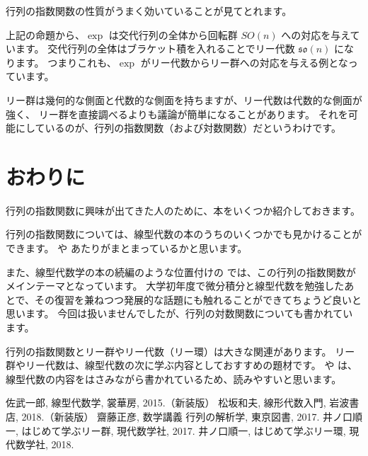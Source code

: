 \documentclass[a5paper]{ltjsarticle}
\begin{document}
行列の指数関数の性質がうまく効いていることが見てとれます。

上記の命題から、\(\exp \) は交代行列の全体から回転群 \(\mathit{SO}(n)\) への対応を与えています。
交代行列の全体はブラケット積を入れることでリー代数 \(\mathfrak{so}(n)\) になります。
つまりこれも、\(\exp \) がリー代数からリー群への対応を与える例となっています。

リー群は幾何的な側面と代数的な側面を持ちますが、リー代数は代数的な側面が強く、
リー群を直接調べるよりも議論が簡単になることがあります。
それを可能にしているのが、行列の指数関数（および対数関数）だというわけです。

\section{おわりに}

行列の指数関数に興味が出てきた人のために、本をいくつか紹介しておきます。

行列の指数関数については、線型代数の本のうちのいくつかでも見かけることができます。
\cite{Satake} や \cite{Matsuzaka} あたりがまとまっているかと思います。

また、線型代数学の本の続編のような位置付けの \cite{Saito} では、この行列の指数関数がメインテーマとなっています。
大学初年度で微分積分と線型代数を勉強したあとで、その復習を兼ねつつ発展的な話題にも触れることができてちょうど良いと思います。
今回は扱いませんでしたが、行列の対数関数についても書かれています。

行列の指数関数とリー群やリー代数（リー環）は大きな関連があります。
リー群やリー代数は、線型代数の次に学ぶ内容としておすすめの題材です。
\cite{Inoguchi} や \cite{Inoguchi2} は、線型代数の内容をはさみながら書かれているため、読みやすいと思います。

\begin{thebibliography}{9}
     佐武一郎, 線型代数学, 裳華房, 2015.（新装版）
     松坂和夫, 線形代数入門, 岩波書店, 2018.（新装版）
     齋藤正彦, 数学講義 行列の解析学, 東京図書, 2017.
     井ノ口順一, はじめて学ぶリー群, 現代数学社, 2017.
     井ノ口順一, はじめて学ぶリー環, 現代数学社, 2018.
\end{thebibliography}
\end{document}
